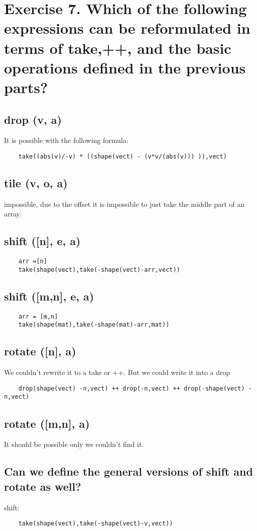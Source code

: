\documentclass[a4paper]{article}
\begin{document}
\section*{Exercise 7. Which of the following expressions can be reformulated in terms of take,++, and the basic operations defined in the previous parts?}
\subsection*{drop (v, a)}
It is possible with the following formula: 
\begin{verbatim}
    take((abs(v)/-v) * ((shape(vect) - (v*v/(abs(v))) )),vect)
\end{verbatim}
\subsection*{tile (v, o, a)}
impossible, due to the offset it is impossible to just take the middle part of an array.
\subsection*{shift ([n], e, a)}
\begin{verbatim}
    arr =[n]
    take(shape(vect),take(-shape(vect)-arr,vect))
\end{verbatim}

\subsection*{shift ([m,n], e, a)}
\begin{verbatim}
    arr = [m,n]
    take(shape(mat),take(-shape(mat)-arr,mat))
\end{verbatim}

\subsection*{rotate ([n], a)}
We couldn't rewrite it to a take or ++. But we could write it into a drop
\begin{verbatim}
    drop(shape(vect) -n,vect) ++ drop(-n,vect) ++ drop(-shape(vect) -n,vect)
\end{verbatim}
\subsection*{rotate ([m,n], a)}
It should be possible only we couldn't find it.
\subsection*{Can we define the general versions of shift and rotate as well?}
shift:
\begin{verbatim}
    take(shape(vect),take(-shape(vect)-v,vect))
\end{verbatim}
\end{document}
